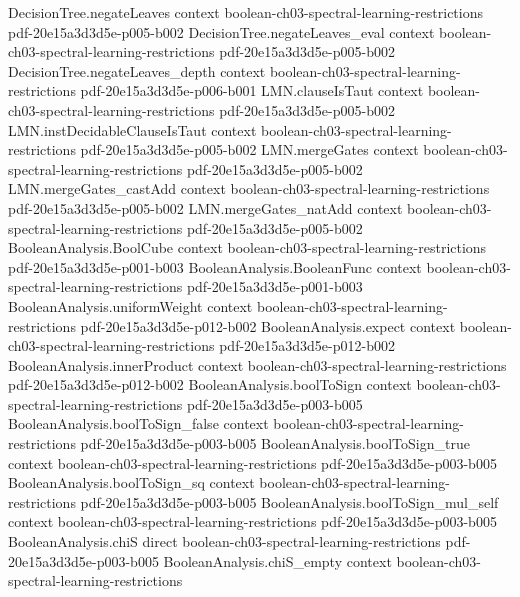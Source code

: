 \begin{theorem}
\proofstep
  {DecisionTree.negateLeaves}
  {context}
  {boolean-ch03-spectral-learning-restrictions}
  {pdf-20e15a3d3d5e-p005-b002}
\proofstep
  {DecisionTree.negateLeaves_eval}
  {context}
  {boolean-ch03-spectral-learning-restrictions}
  {pdf-20e15a3d3d5e-p005-b002}
\proofstep
  {DecisionTree.negateLeaves_depth}
  {context}
  {boolean-ch03-spectral-learning-restrictions}
  {pdf-20e15a3d3d5e-p006-b001}
\proofstep
  {LMN.clauseIsTaut}
  {context}
  {boolean-ch03-spectral-learning-restrictions}
  {pdf-20e15a3d3d5e-p005-b002}
\proofstep
  {LMN.instDecidableClauseIsTaut}
  {context}
  {boolean-ch03-spectral-learning-restrictions}
  {pdf-20e15a3d3d5e-p005-b002}
\proofstep
  {LMN.mergeGates}
  {context}
  {boolean-ch03-spectral-learning-restrictions}
  {pdf-20e15a3d3d5e-p005-b002}
\proofstep
  {LMN.mergeGates_castAdd}
  {context}
  {boolean-ch03-spectral-learning-restrictions}
  {pdf-20e15a3d3d5e-p005-b002}
\proofstep
  {LMN.mergeGates_natAdd}
  {context}
  {boolean-ch03-spectral-learning-restrictions}
  {pdf-20e15a3d3d5e-p005-b002}
\proofstep
  {BooleanAnalysis.BoolCube}
  {context}
  {boolean-ch03-spectral-learning-restrictions}
  {pdf-20e15a3d3d5e-p001-b003}
\proofstep
  {BooleanAnalysis.BooleanFunc}
  {context}
  {boolean-ch03-spectral-learning-restrictions}
  {pdf-20e15a3d3d5e-p001-b003}
\proofstep
  {BooleanAnalysis.uniformWeight}
  {context}
  {boolean-ch03-spectral-learning-restrictions}
  {pdf-20e15a3d3d5e-p012-b002}
\proofstep
  {BooleanAnalysis.expect}
  {context}
  {boolean-ch03-spectral-learning-restrictions}
  {pdf-20e15a3d3d5e-p012-b002}
\proofstep
  {BooleanAnalysis.innerProduct}
  {context}
  {boolean-ch03-spectral-learning-restrictions}
  {pdf-20e15a3d3d5e-p012-b002}
\proofstep
  {BooleanAnalysis.boolToSign}
  {context}
  {boolean-ch03-spectral-learning-restrictions}
  {pdf-20e15a3d3d5e-p003-b005}
\proofstep
  {BooleanAnalysis.boolToSign_false}
  {context}
  {boolean-ch03-spectral-learning-restrictions}
  {pdf-20e15a3d3d5e-p003-b005}
\proofstep
  {BooleanAnalysis.boolToSign_true}
  {context}
  {boolean-ch03-spectral-learning-restrictions}
  {pdf-20e15a3d3d5e-p003-b005}
\proofstep
  {BooleanAnalysis.boolToSign_sq}
  {context}
  {boolean-ch03-spectral-learning-restrictions}
  {pdf-20e15a3d3d5e-p003-b005}
\proofstep
  {BooleanAnalysis.boolToSign_mul_self}
  {context}
  {boolean-ch03-spectral-learning-restrictions}
  {pdf-20e15a3d3d5e-p003-b005}
\proofstep
  {BooleanAnalysis.chiS}
  {direct}
  {boolean-ch03-spectral-learning-restrictions}
  {pdf-20e15a3d3d5e-p003-b005}
\proofstep
  {BooleanAnalysis.chiS_empty}
  {context}
  {boolean-ch03-spectral-learning-restrictions}

\end{theorem}
